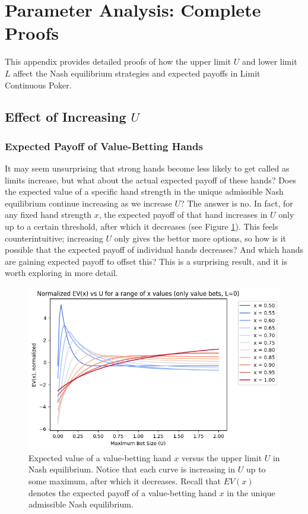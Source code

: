 \documentclass[../../main/main.tex]{subfiles}
\begin{document}
\section{Parameter Analysis: Complete Proofs}
\label{sec:parameter_analysis}

This appendix provides detailed proofs of how the upper limit $U$ and lower limit $L$ affect the Nash equilibrium strategies and expected payoffs in Limit Continuous Poker.

\subsection{Effect of Increasing $U$}

\subsubsection{Expected Payoff of Value-Betting Hands}

It may seem unsurprising that strong hands become less likely to get called as limits increase, but what about the actual expected payoff of these hands? Does the expected value of a specific hand strength in the unique admissible Nash equilibrium continue increasing as we increase $U$? The answer is no. In fact, for any fixed hand strength $x$, the expected payoff of that hand increases in $U$ only up to a certain threshold, after which it decreases (see Figure \ref{fig:ev_x_vs_U_appendix}). This feels counterintuitive; increasing $U$ only gives the bettor more options, so how is it possible that the expected payoff of individual hands decreases? And which hands are gaining expected payoff to offset this? This is a surprising result, and it is worth exploring in more detail.

\begin{figure}[h!]
    \centering
    \includegraphics[width=\textwidth]{../parameter_analysis/images/ev_vs_U.png}
    \caption{Expected value of a value-betting hand $x$ versus the upper limit $U$ in Nash equilibrium. Notice that each curve is increasing in $U$ up to some maximum, after which it decreases. Recall that $EV(x)$ denotes the expected payoff of a value-betting hand $x$ in the unique admissible Nash equilibrium.}
    \label{fig:ev_x_vs_U_appendix}
\end{figure}
\end{document}
